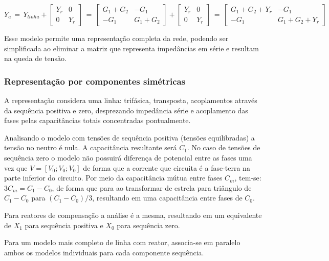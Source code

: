 \begin{equation} \label{slide:4}
    Y_a \, = \, Y_{linha} + \begin{bmatrix} Y_r & 0 \\ 0 & Y_r \end{bmatrix} \, = \, \begin{bmatrix} G_1+G_2 & -G_1 \\ -G_1 & G_1+G_2 \end{bmatrix} + \begin{bmatrix} Y_r & 0 \\ 0 & Y_r \end{bmatrix} \, = \, \begin{bmatrix} G_1+G_2+Y_r & -G_1 \\ -G_1 & G_1+G_2+Y_r \end{bmatrix}  
\end{equation}

Esse modelo permite uma representação completa da rede, podendo ser simplificada ao eliminar a matriz que representa impedâncias em série e resultam na queda de tensão.

\subsubsection{Representação por componentes simétricas}

A representação considera uma linha: trifásica, transposta, acoplamentos através da sequência positiva e zero, desprezando impedância série e acoplamento das fases pelas capacitâncias totais concentradas pontualmente.

Analisando o modelo com tensões de sequência positiva (tensões equilibradas) a tensão no neutro é nula. A capacitância resultante será $C_1$. No caso de tensões de sequência zero o modelo não possuirá diferença de potencial entre as fases uma vez que $V= [V_0;V_0;V_0]$ de forma que a corrente que circuita é a fase-terra na parte inferior do circuito. Por meio da capacitância mútua entre fases $C_m$, tem-se: $3C_m = C_1-C_0$, de forma que para ao transformar de estrela para triângulo de $C_1-C_0$ para $(C_1-C_0)/3$, resultando em uma capacitância entre fases de $C_0$.

Para reatores de compensação a análise é a mesma, resultando em um equivalente de $X_1$ para sequência positiva e $X_0$ para sequência zero.

Para um modelo mais completo de linha com reator, associa-se em paralelo ambos os modelos individuais para cada componente sequência.

